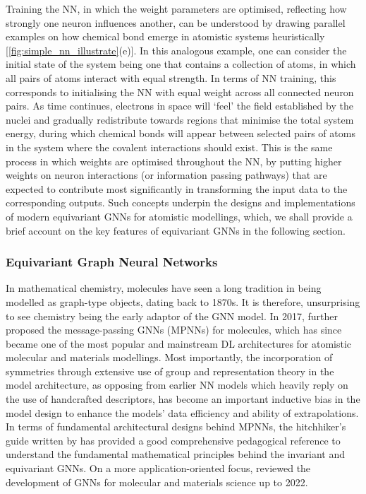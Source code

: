 Training the NN, in which the weight parameters are optimised, reflecting how strongly one neuron influences another, can be understood by drawing parallel examples on how chemical bond emerge in atomistic systems heuristically [\cref{fig:simple_nn_illustrate}(e)]. In this analogous example, one can consider the initial state of the system being one that contains a collection of atoms, in which all pairs of atoms interact with equal strength. In terms of NN training, this corresponds to initialising the NN with equal weight across all connected neuron pairs. As time continues, electrons in space will `feel' the field established by the nuclei and gradually redistribute towards regions that minimise the total system energy, during which chemical bonds will appear between selected pairs of atoms in the system where the covalent interactions should exist. This is the same process in which weights are optimised throughout the NN, by putting higher weights on neuron interactions (or information passing pathways) that are expected to contribute most significantly in transforming the input data to the corresponding outputs.  Such concepts underpin the designs and implementations of modern equivariant GNNs for atomistic modellings, which,  we shall provide a brief account on the key features of equivariant GNNs in the following section.

\subsubsection{Equivariant Graph Neural Networks}

In mathematical chemistry, molecules have seen a long tradition in being modelled as graph-type objects, dating back to 1870s.\cite{cayley1874lvii} It is therefore, unsurprising to see chemistry being the early adaptor of the GNN model.\cite{duvenaud2015convolutional} In 2017, \citet{gilmer2017neural} further proposed the message-passing GNNs (MPNNs) for molecules, which has since became one of the most popular and mainstream DL architectures for atomistic molecular and materials modellings. Most importantly, the incorporation of symmetries through extensive use of group and representation theory in the model architecture, as opposing from earlier NN models\cite{behler2021four} which heavily reply on the use of handcrafted descriptors,  has become an important inductive bias in the model design to enhance the models' data efficiency and ability of extrapolations.\cite{fu2022forces,frank2022so3krates} In terms of fundamental architectural designs behind MPNNs, the hitchhiker's guide written by \citet{duval2023hitchhiker} has provided a good comprehensive pedagogical reference to understand the fundamental mathematical principles behind the invariant and equivariant GNNs. On a more application-oriented focus, \citet{ reiser2022graph} reviewed the development of GNNs for molecular and materials science up to 2022. 

